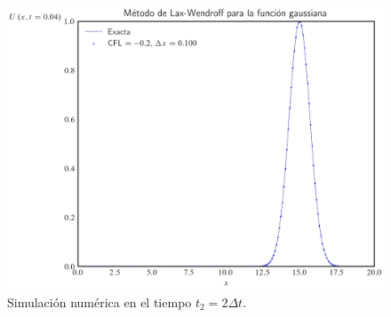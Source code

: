 \begin{figure}[ht!]
	\includegraphics[width=.30\paperwidth]{../snapshots/lax-wendroffgaussiana1d-2.png}
	\caption{Simulación numérica en el tiempo $t_{2}=2\Delta t$.}
	\label{fig:example1t2}
\end{figure}

